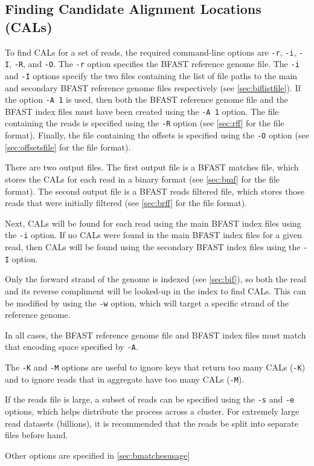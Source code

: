 \documentclass[a4paper,12pt]{book}
\newcommand{\TT}[1]{{\tt #1}} %
\newcommand{\BRGF}{BFAST reference genome file} %
\newcommand{\BIF}{BFAST index file} %
\newcommand{\BMF}{BFAST matches file} %
\newcommand{\BRFF}{BFAST reads filtered file} %
\begin{document}
\subsection{Finding Candidate Alignment Locations (CALs)}
\label{sec:finding-cals}
To find CALs for a set of reads, the required command-line options are \TT{-r}, \TT{-i}, \TT{-I}, \TT{-R}, and \TT{-O}.
The \TT{-r} option specifies the \BRGF{}.
The \TT{-i} and \TT{-I} options specify the two files containing the list of file paths to the main and secondary \BRGF{s} respectively (see \autoref{sec:biflistfile}).
If the option \TT{-A 1} is used, then both the \BRGF{} and the \BIF{s} must have been created using the \TT{-A 1} option.
The file containing the reads is specified using the \TT{-R} option (see \autoref{sec:rff} for the file format).
Finally, the file containing the offsets is specified using the \TT{-O} option (see \autoref{sec:offsetsfile} for the file format).

There are two output files.
The first output file is a \BMF{}, which stores the CALs for each read in a binary format (see \autoref{sec:bmf} for the file format).
The second output file is a \BRFF{}, which stores those reads that were initially filtered (see \autoref{sec:brff} for the file format).

Next, CALs will be found for each read using the main \BIF{s} using the \TT{-i} option.
If no CALs were found in the main \BIF{s} for a given read, then CALs will be found using the secondary \BIF{s} using the \TT{-I} option.

Only the forward strand of the genome is indexed (see \autoref{sec:bif}), so both the read and its reverse compliment will be looked-up in the index to find CALs.  
This can be modified by using the \TT{-w} option, which will target a specific strand of the reference genome.

In all cases, the \BRGF{} and \BIF{s} must match that encoding space specified by \TT{-A}.

The \TT{-K} and \TT{-M} options are useful to ignore keys that return too many CALs (\TT{-K}) and to ignore reads that in aggregate have too many CALs (\TT{-M}).

If the reads file is large, a subset of reads can be specified using the \TT{-s} and \TT{-e} options, which helps distribute the process across a cluster.
For extremely large read datasets (billions), it is recommended that the reads be split into separate files before hand.

Other options are specified in \autoref{sec:bmatchesusage}
\end{document}
